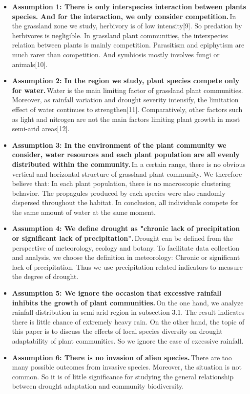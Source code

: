 \documentclass{mcmthesis}
\begin{document}
\begin{itemize}
	\item \textbf{Assumption 1: There is only interspecies interaction between plants species. And for the interaction, we only consider competition.}\,In the grassland zone we study, herbivory is of low intensity[9]. So predation by herbivores is negligible. In grassland plant communities, the interspecies relation between plants is mainly competition. Parasitism and epiphytism are much rarer than competition. And symbiosis mostly involves fungi or animals[10].
	
	\item \textbf{Assumption 2: In the region we study, plant species compete only for water.}\,Water is the main limiting factor of grassland plant communities. Moreover, as rainfall variation and drought severity intensify, the limitation effect of water continues to strengthen[11].  Comparatively, other factors such as light and nitrogen are not the main factors limiting plant growth in most semi-arid areas[12].
	
	\item \textbf{Assumption 3: In the environment of the plant community we consider, water resources and each plant population are all evenly distributed within the community.}\,In a certain range, there is no obvious vertical and horizontal structure of grassland plant community. We therefore believe that: In each plant population, there is no macroscopic clustering behavior. The propagules produced by each species were also randomly dispersed throughout the habitat. In conclusion, all individuals compete for the same amount of water at the same moment.
	
	\item \textbf{Assumption 4: We define drought as "chronic lack of precipitation or significant lack of precipitation".}\,Drought can be defined from the perspective of meteorology, ecology and botany. To facilitate data collection and analysis, we choose the definition in meteorology: Chronic or significant lack of precipitation. Thus we use precipitation related indicators to measure the degree of drought.
	
	\item \textbf{Assumption 5: We ignore the occasion that excessive rainfall inhibits the growth of plant communities.}\,On the one hand, we analyze rainfall distribution in semi-arid region in subsection 3.1. The result indicates there is little chance of extremely heavy rain. On the other hand, the topic of this paper is to discuss the effects of local species diversity on drought adaptability of plant communities. So we ignore the case of excessive rainfall.
	
	\item \textbf{Assumption 6: There is no invasion of alien species.}\,There are too many possible outcomes from invasive species. Moreover, the situation is not common. So it is of little significance for studying the general relationship between drought adaptation and community biodiversity.
	
\end{itemize}
\end{document}
